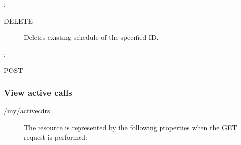 \documentclass[letterpaper,10pt,english]{sphinxmanual}
\begin{document}
:

\begin{sphinxVerbatim}[commandchars=\\\{\}]
\end{sphinxVerbatim}
\begin{description}
\item[{ DELETE}] \leavevmode
Deletes existing schedule of the specified ID.

\end{description}

:

\begin{sphinxVerbatim}[commandchars=\\\{\}]
\end{sphinxVerbatim}

 POST


\subsubsection{View active calls}
\label{\detokenize{restapi:view-active-calls}}
 /my/activecdrs
\begin{description}
\item[{}] \leavevmode
The resource is represented by the following properties when the GET request is performed:

\end{description}
\end{document}
